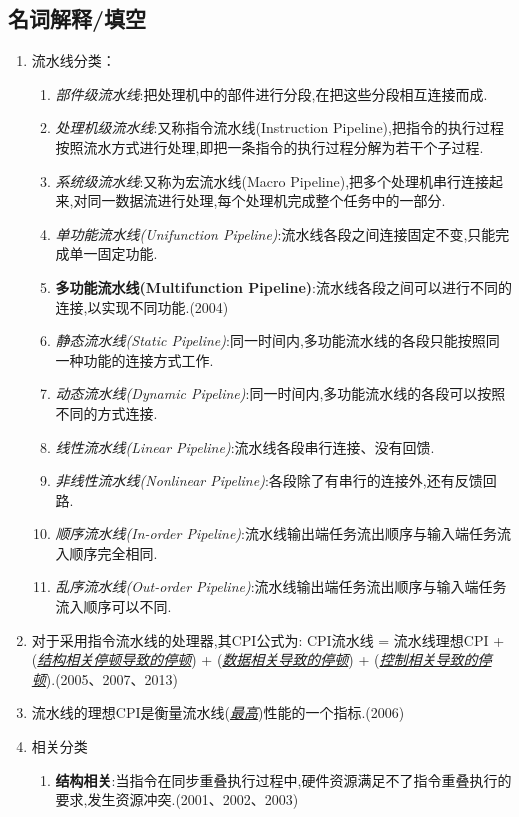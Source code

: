 \documentclass[a4paper]{ctexart}
\begin{document}
\subsection{名词解释/填空}
\begin{enumerate}
  \item 流水线分类：
  \begin{enumerate}
    \item \emph{部件级流水线}:把处理机中的部件进行分段,在把这些分段相互连接而成.
    \item \emph{处理机级流水线}:又称指令流水线(Instruction Pipeline),把指令的执行过程按照流水方式进行处理,即把一条指令的执行过程分解为若干个子过程.
    \item \emph{系统级流水线}:又称为宏流水线(Macro Pipeline),把多个处理机串行连接起来,对同一数据流进行处理,每个处理机完成整个任务中的一部分.
    \item \emph{单功能流水线(Unifunction Pipeline)}:流水线各段之间连接固定不变,只能完成单一固定功能.
    \item \textbf{多功能流水线(Multifunction Pipeline)}:流水线各段之间可以进行不同的连接,以实现不同功能.(2004)
    \item \emph{静态流水线(Static Pipeline)}:同一时间内,多功能流水线的各段只能按照同一种功能的连接方式工作.
    \item \emph{动态流水线(Dynamic Pipeline)}:同一时间内,多功能流水线的各段可以按照不同的方式连接.
    \item \emph{线性流水线(Linear Pipeline)}:流水线各段串行连接、没有回馈.
    \item \emph{非线性流水线(Nonlinear Pipeline)}:各段除了有串行的连接外,还有反馈回路.
    \item \emph{顺序流水线(In-order Pipeline)}:流水线输出端任务流出顺序与输入端任务流入顺序完全相同.
    \item \emph{乱序流水线(Out-order Pipeline)}:流水线输出端任务流出顺序与输入端任务流入顺序可以不同.
  \end{enumerate}
  \item 对于采用指令流水线的处理器,其CPI公式为: CPI流水线 = 流水线理想CPI + (\emph{\underline{结构相关停顿导致的停顿}}) + (\emph{\underline{数据相关导致的停顿}}) + (\emph{\underline{控制相关导致的停顿}}).(2005、2007、2013)
  \item 流水线的理想CPI是衡量流水线(\emph{\underline{最高}})性能的一个指标.(2006)
  \item 相关分类
  \begin{enumerate}
    \item \textbf{结构相关}:当指令在同步重叠执行过程中,硬件资源满足不了指令重叠执行的要求,发生资源冲突.(2001、2002、2003)

\end{enumerate}
\end{enumerate}
\end{document}

